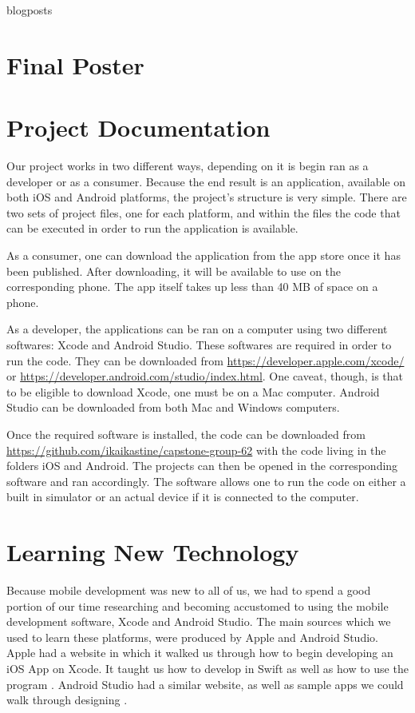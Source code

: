 \documentclass[letterpaper,10pt,draftclsnofoot,onecolumn,titlepage]{IEEEtran}
\begin{document}
	{blogposts}

\section{Final Poster}



\section{Project Documentation}

Our project works in two different ways, depending on it is begin ran as a developer or as a consumer.
Because the end result is an application, available on both iOS and Android platforms, the project's structure is very simple.
There are two sets of project files, one for each platform, and within the files the code that can be executed in order to run the application is available.

As a consumer, one can download the application from the app store once it has been published.
After downloading, it will be available to use on the corresponding phone.
The app itself takes up less than 40 MB of space on a phone.

As a developer, the applications can be ran on a computer using two different softwares: Xcode and Android Studio.
These softwares are required in order to run the code.
They can be downloaded from \url{https://developer.apple.com/xcode/} or \url{https://developer.android.com/studio/index.html}.
One caveat, though, is that to be eligible to download Xcode, one must be on a Mac computer.
Android Studio can be downloaded from both Mac and Windows computers.

Once the required software is installed, the code can be downloaded from \url{https://github.com/ikaikastine/capstone-group-62} with the code living in the folders iOS and Android.
The projects can then be opened in the corresponding software and ran accordingly.
The software allows one to run the code on either a built in simulator or an actual device if it is connected to the computer.



\section{Learning New Technology}
Because mobile development was new to all of us, we had to spend a good portion of our time researching and becoming accustomed to using the mobile development software, Xcode and Android Studio.
The main sources which we used to learn these platforms, were produced by Apple and Android Studio.
Apple had a website in which it walked us through how to begin developing an iOS App on Xcode.
It taught us how to develop in Swift as well as how to use the program \cite{AppleSwift}.
Android Studio had a similar website, as well as sample apps we could walk through designing \cite{AndroidStudio}.
\end{document}
